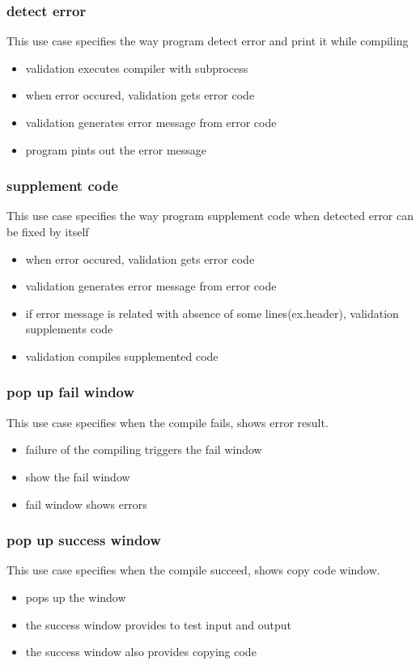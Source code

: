 \documentclass[conference]{IEEEtran}
\begin{document}
\subsubsection{detect error}
This use case specifies the way program detect error and print it while compiling

\begin{itemize}
  \item validation executes compiler with subprocess   
  \item when error occured, validation gets error code
  \item validation generates error message from error code
  \item program pints out the error message
\end{itemize}
\textit{}



\subsubsection{supplement code}
This use case specifies the way program supplement code when detected error can be fixed by itself

\begin{itemize}
  \item when error occured, validation gets error code
  \item validation generates error message from error code
  \item if error message is related with absence of some lines(ex.header), validation supplements code
  \item validation compiles supplemented code
\end{itemize}
\textit{}



\subsubsection{pop up fail window}
This use case specifies when the compile fails, shows error result.
\begin{itemize}
  \item failure of the compiling triggers the fail window
  \item show the fail window
  \item fail window shows errors
\end{itemize}
\textit{}



\subsubsection{pop up success window}
This use case specifies when the compile succeed, shows copy code window.
\begin{itemize}
  \item pops up the window
  \item the success window provides to test input and output
  \item the success window also provides copying code
\end{itemize}
\textit{}
\end{document}
